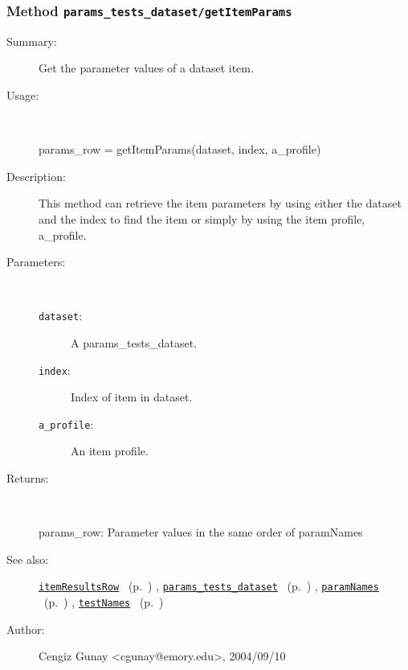 \subsubsection[Method \texttt{getItemParams}]{Method \texttt{params\_tests\_dataset/getItemParams}}%
%
\label{ref_params_tests_dataset__getItemParams}%
\hypertarget{ref_params_tests_dataset__getItemParams}{}%
\begin{description}
\item[Summary:]Get the parameter values of a dataset item.
%
\item[Usage:]~%
\begin{lyxcode}%
params\_row = getItemParams(dataset, index, a\_profile)
%
\end{lyxcode}%
%
\item[Description:]%
This method can retrieve the item parameters by using either the 
 dataset and the index to find the item or simply by using
 the item profile, a\_profile.
\item[Parameters:]~
\begin{description}%
\item[\texttt{dataset}:]
 A params\_tests\_dataset.
\item[\texttt{index}:]
 Index of item in dataset.
\item[\texttt{a\_profile}:]
 An item profile.
\end{description}%
%
\item[Returns:]~

	params\_row: Parameter values in the same order of paramNames
%
%
\item[See also:]%
\hyperlink{ref_itemResultsRow}{\texttt{itemResultsRow}}%
\ (p.~\pageref{ref_itemResultsRow})%
%
, \hyperlink{ref_params_tests_dataset}{\texttt{params\_tests\_dataset}}%
\ (p.~\pageref{ref_params_tests_dataset})%
%
, \hyperlink{ref_paramNames}{\texttt{paramNames}}%
\ (p.~\pageref{ref_paramNames})%
%
, \hyperlink{ref_testNames}{\texttt{testNames}}%
\ (p.~\pageref{ref_testNames})%
%
%
\item[Author:]%
Cengiz Gunay <cgunay@emory.edu>, 2004/09/10%
\end{description}
\methodline%
